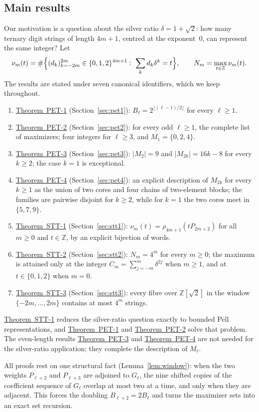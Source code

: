 \documentclass[11pt]{amsart}
\theoremstyle{definition}
\theoremstyle{remark}
\theoremstyle{plain}
\numberwithin{equation}{section}
\newcommand{\Z}{\mathbb{Z}}
\newcommand{\floor}[1]{\lfloor #1\rfloor}
\newcommand{\PETone}{\hyperref[thm:pet1]{Theorem~PET-1}}
\newcommand{\PETtwo}{\hyperref[thm:pet2]{Theorem~PET-2}}
\newcommand{\PETthree}{\hyperref[thm:pet3]{Theorem~PET-3}}
\newcommand{\PETfour}{\hyperref[thm:pet4]{Theorem~PET-4}}
\newcommand{\STTone}{\hyperref[thm:stt1]{Theorem~STT-1}}
\newcommand{\STTtwo}{\hyperref[thm:stt2]{Theorem~STT-2}}
\newcommand{\STTthree}{\hyperref[thm:stt3]{Theorem~STT-3}}
\begin{document}
\subsection{Main results}
Our motivation is a question about the silver ratio $\delta=1+\sqrt2$: how many ternary digit strings
of length $4m+1$, centred at the exponent~$0$, can represent the same integer? Let
\[
\nu_m(t)=\#\Bigl\{(d_k)_{k=-2m}^{2m}\in\{0,1,2\}^{4m+1}:\ \sum_kd_k\delta^k=t\Bigr\},\qquad
N_m=\max_{t\in\Z}\nu_m(t).
\]
The results are stated under seven canonical identifiers, which we keep throughout.
\begin{enumerate}[label=\textbullet,leftmargin=1.6em]
\item \PETone{} (Section~\ref{sec:pet1}): $B_\ell=2^{\floor{(\ell-1)/2}}$ for every $\ell\ge1$.
\item \PETtwo{} (Section~\ref{sec:pet2}): for every odd $\ell\ge1$, the complete list of maximizers;
four integers for $\ell\ge3$, and $M_1=\{0,2,4\}$.
\item \PETthree{} (Section~\ref{sec:pet3}): $|M_2|=9$ and $|M_{2k}|=16k-8$ for every $k\ge2$; the
case $k=1$ is exceptional.
\item \PETfour{} (Section~\ref{sec:pet4}): an explicit description of $M_{2k}$ for every $k\ge1$ as
the union of two cores and four chains of two-element blocks; the families are pairwise disjoint for
$k\ge2$, while for $k=1$ the two cores meet in $\{5,7,9\}$.
\item \STTone{} (Section~\ref{sec:stt1}): $\nu_m(t)=\rho_{4m+1}(tP_{2m+2})$ for all $m\ge0$ and
$t\in\Z$, by an explicit bijection of words.
\item \STTtwo{} (Section~\ref{sec:stt2}): $N_m=4^m$ for every $m\ge0$; the maximum is attained only
at the integer $C_m=\sum_{j=-m}^m\delta^{2j}$ when $m\ge1$, and at $t\in\{0,1,2\}$ when $m=0$.
\item \STTthree{} (Section~\ref{sec:stt3}): every fibre over $\Z[\sqrt2]$ in the window
$\{-2m,\dots,2m\}$ contains at most $4^m$ strings.
\end{enumerate}
\STTone{} reduces the silver-ratio question exactly to bounded Pell representations, and
\PETone{} and \PETtwo{} solve that problem. The even-length results \PETthree{} and \PETfour{} are not
needed for the silver-ratio application; they complete the description of $M_\ell$.

All proofs rest on one structural fact (Lemma~\ref{lem:window}): when the two weights $P_{\ell+2}$
and $P_{\ell+3}$ are adjoined to $G_\ell$, the nine shifted copies of the coefficient sequence of
$G_\ell$ overlap at most two at a time, and only when they are adjacent. This forces the doubling
$B_{\ell+2}=2B_\ell$ and turns the maximizer sets into an exact set recursion.
\end{document}
